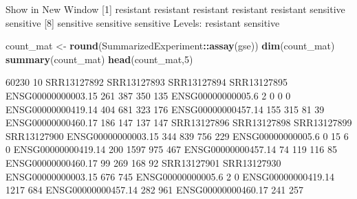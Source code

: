 \documentclass[
]{article}
\newenvironment{Shaded}{\begin{snugshade}}{\end{snugshade}}
\newcommand{\CommentTok}[1]{\textcolor[rgb]{0.56,0.35,0.01}{\textit{#1}}}
\newcommand{\DecValTok}[1]{\textcolor[rgb]{0.00,0.00,0.81}{#1}}
\newcommand{\FunctionTok}[1]{\textcolor[rgb]{0.13,0.29,0.53}{\textbf{#1}}}
\newcommand{\NormalTok}[1]{#1}
\newcommand{\OtherTok}[1]{\textcolor[rgb]{0.56,0.35,0.01}{#1}}
\newcommand{\SpecialCharTok}[1]{\textcolor[rgb]{0.81,0.36,0.00}{\textbf{#1}}}
\begin{document}
\begin{Shaded}
\end{Shaded}

\begin{Shaded}
\begin{Highlighting}[]
\NormalTok{Show in New Window}
\NormalTok{ [1] resistant resistant resistant resistant resistant sensitive sensitive}
\NormalTok{ [8] sensitive sensitive sensitive}
\NormalTok{Levels: resistant sensitive}
\end{Highlighting}
\end{Shaded}

\begin{Shaded}
\begin{Highlighting}[]
\NormalTok{count\_mat }\OtherTok{\textless{}{-}} \FunctionTok{round}\NormalTok{(SummarizedExperiment}\SpecialCharTok{::}\FunctionTok{assay}\NormalTok{(gse))}
\FunctionTok{dim}\NormalTok{(count\_mat)}
\FunctionTok{summary}\NormalTok{(count\_mat)}
\FunctionTok{head}\NormalTok{(count\_mat,}\DecValTok{5}\NormalTok{)}
\end{Highlighting}
\end{Shaded}

\begin{Shaded}
\begin{Highlighting}[]
\NormalTok{[1] 60230    10}
\NormalTok{                   SRR13127892 SRR13127893 SRR13127894 SRR13127895}
\NormalTok{ENSG00000000003.15         261         387         350         135}
\NormalTok{ENSG00000000005.6            2           0           0           0}
\NormalTok{ENSG00000000419.14         404         681         323         176}
\NormalTok{ENSG00000000457.14         155         315          81          39}
\NormalTok{ENSG00000000460.17         186         147         137         147}
\NormalTok{                   SRR13127896 SRR13127898 SRR13127899 SRR13127900}
\NormalTok{ENSG00000000003.15         344         839         756         229}
\NormalTok{ENSG00000000005.6            0          15           6           0}
\NormalTok{ENSG00000000419.14         200        1597         975         467}
\NormalTok{ENSG00000000457.14          74         119         116          85}
\NormalTok{ENSG00000000460.17          99         269         168          92}
\NormalTok{                   SRR13127901 SRR13127930}
\NormalTok{ENSG00000000003.15         676         745}
\NormalTok{ENSG00000000005.6            2           0}
\NormalTok{ENSG00000000419.14        1217         684}
\NormalTok{ENSG00000000457.14         282         961}
\NormalTok{ENSG00000000460.17         241         257}
\end{Highlighting}
\end{Shaded}
\end{document}
